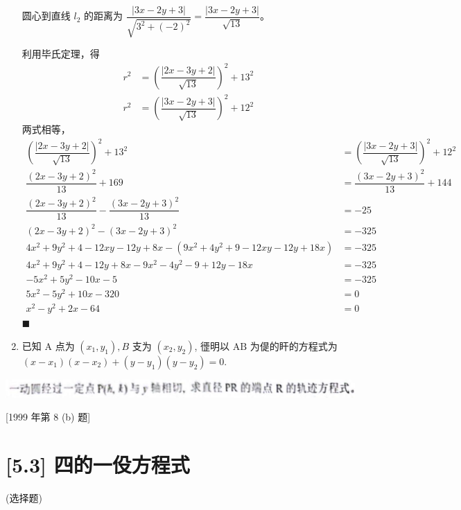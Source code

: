 \documentclass[10pt]{article}
\begin{document}
\begin{enumerate}
  圆心到直线 $l_{2}$ 的距离为 $\dfrac{|3x-2y+3|}{\sqrt{3^{2}+(-2)^{2}}} = \dfrac{|3x-2y+3|}{\sqrt{13}}$。

  利用毕氏定理，得
  \begin{align*}
    r^{2} &= \left(\dfrac{|2x-3y+2|}{\sqrt{13}}\right)^{2} + 13^{2}\\
    r^2 &= \left(\dfrac{|3x-2y+3|}{\sqrt{13}}\right)^{2} + 12^{2}
  \end{align*}
  两式相等，
  \begin{align*}
    \left(\dfrac{|2x-3y+2|}{\sqrt{13}}\right)^{2} + 13^{2} &= \left(\dfrac{|3x-2y+3|}{\sqrt{13}}\right)^{2} + 12^{2}\\
    \dfrac{(2x-3y+2)^{2}}{13} + 169 &= \dfrac{(3x-2y+3)^{2}}{13} + 144\\
    \dfrac{(2x-3y+2)^{2}}{13} - \dfrac{(3x-2y+3)^{2}}{13} & = -25\\
    (2x-3y+2)^{2} - (3x-2y+3)^{2} &= -325\\
    4x^{2} + 9y^{2} + 4 - 12xy - 12y + 8x - (9x^{2} + 4y^{2} + 9 - 12xy - 12y + 18x) &= -325\\
    4x^{2} + 9y^{2} + 4 - 12y + 8x - 9x^{2} - 4y^{2} - 9 + 12y - 18x &= -325\\
    -5x^{2} + 5y^{2} - 10x - 5 &= -325\\
    5x^{2} - 5y^{2} + 10x - 320 &= 0\\
    x^{2} - y^{2} + 2x - 64 &= 0
  \end{align*} \hfill$\blacksquare$

  \item 已知 $\mathrm{A}$ 点为 $\left(x_{1}, y_{1}\right), B$ 支为 $\left(x_{2}, y_{2}\right)$, 徰明以 $\mathrm{AB}$ 为偍的盰的方程式为 $\left(x-x_{1}\right)\left(x-x_{2}\right)+\left(y-y_{1}\right)\left(y-y_{2}\right)=0$.

\end{enumerate}

\begin{center}
\includegraphics[max width=\textwidth]{2024_06_07_f484519cd4dc635602b3g-02(1)}
\end{center}

[1999 年第 8 (b) 题]

\section*{[5.3] 四的一伇方程式}
(选择题)
\end{document}
